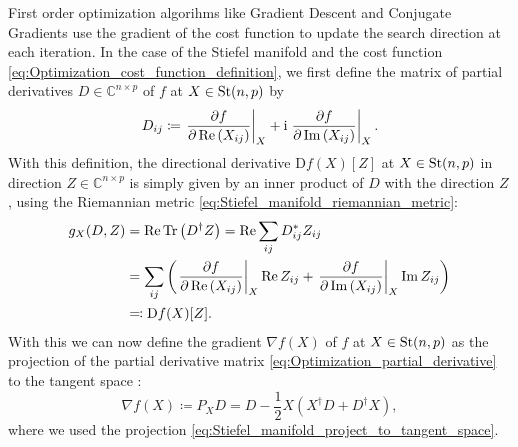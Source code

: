 First order optimization algorihms like Gradient Descent and Conjugate Gradients use the gradient of the cost function to update the search direction at each iteration. In the case of the Stiefel manifold and the cost function \eqref{eq:Optimization_cost_function_definition}, we first define the matrix of partial derivatives $D \in \mathbb{C}^{n\times p}$ of $f$ at $X\in\text{St}(n,p)$ by
\begin{equation}
	\label{eq:Optimization_partial_derivative}
	D_{ij} \coloneqq \left.\frac{\partial f}{\partial \operatorname{Re}\left(X_{ij}\right)}\right|_{X} + \mathrm{i} \left.\frac{\partial f}{\partial \operatorname{Im}\left(X_{ij}\right)}\right|_{X}.
\end{equation}
With this definition, the directional derivative $\text{D}f(X)[Z]$ at $X\in\text{St}(n,p)$ in direction $Z\in\mathbb{C}^{n\times p}$ is simply given by an inner product of $D$ with the direction $Z$, using the Riemannian metric \eqref{eq:Stiefel_manifold_riemannian_metric}:
\begin{equation}
	\label{eq:riemannian_optimization_directional_derivative_partial_derivatives}
	\begin{split}
		g_X(D, Z) &= \operatorname{Re}\operatorname{Tr}\left(D^\dagger Z\right) = \operatorname{Re}\sum_{ij} D_{ij}^*Z_{ij} \\
		&= \sum_{ij} \left(\left.\frac{\partial f}{\partial \operatorname{Re}\left(X_{ij}\right)}\right|_{X}\operatorname{Re} Z_{ij} + \left.\frac{\partial f}{\partial \operatorname{Im}\left(X_{ij}\right)}\right|_{X} \operatorname{Im} Z_{ij}\right) \\
		&\eqqcolon \text{D}f(X)[Z].
	\end{split}
\end{equation}
With this we can now define the gradient $\nabla f(X)$ of $f$ at $X\in\text{St}(n,p)$ as the projection of the partial derivative matrix \eqref{eq:Optimization_partial_derivative} to the tangent space \cite{cite:optimization_on_matrix_manifolds, cite:riemannian_optimization_isometric_tensor_networks}:
\begin{equation}
	\label{eq:riemannian_optimization_gradient_of_cost_function}
	\nabla f(X) \coloneqq P_X D = D - \frac{1}{2}X\left(X^\dagger D + D^\dagger X\right),
\end{equation}
where we used the projection \eqref{eq:Stiefel_manifold_project_to_tangent_space}.